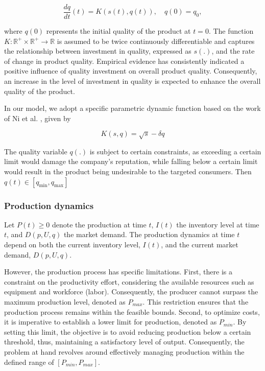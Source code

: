 \documentclass[]{interact}
\theoremstyle{plain}%
\theoremstyle{definition}
\theoremstyle{remark}
\begin{document}
\begin{equation}
	\frac{dq}{dt}(t) = K(s(t), q(t)), \quad q(0) = q_0,
\end{equation}

where $q(0)$ represents the initial quality of the product at $t=0$. The function $K: \mathbb{R}^{+} \times \mathbb{R}^{+} \rightarrow \mathbb{R}$ is assumed to be twice continuously differentiable and captures the relationship between investment in quality, expressed as $s(.)$, and the rate of change in product quality. Empirical evidence has consistently indicated a positive influence of quality investment on overall product quality. Consequently, an increase in the level of investment in quality is expected to enhance the overall quality of the product.

In our model, we adopt a specific parametric dynamic function based on the work of Ni et al. \cite{ni2019better}, given by

\[K(s, q) = \sqrt{s} - \delta q\]

The quality variable $q(.)$ is subject to certain constraints, as exceeding a certain limit would damage the company's reputation, while falling below a certain limit would result in the product being undesirable to the targeted consumers. Then $q(t) \in [q_{\text{min}}, q_{\text{max}}]$ 

\subsubsection{Production dynamics}

Let $P(t) \geq 0$ denote the production at time $t$, $I(t)$ the inventory level at time $t$, and $D(p,U,q)$ the market demand. The production dynamics at time $t$ depend on both the current inventory level, $I(t)$, and the current market demand, $D(p,U,q)$. 

However, the production process has specific limitations. First, there is a constraint on the productivity effort, considering the available resources such as equipment and workforce (labor). Consequently, the producer cannot surpass the maximum production level, denoted as $P_{max}$. This restriction ensures that the production process remains within the feasible bounds. Second, to optimize costs, it is imperative to establish a lower limit for production, denoted as $P_{min}$. By setting this limit, the objective is to avoid reducing production below a certain threshold, thus, maintaining a satisfactory level of output. Consequently, the problem at hand revolves around effectively managing production within the defined range of $[ P_{min}, P_{max} ]$.
\end{document}
